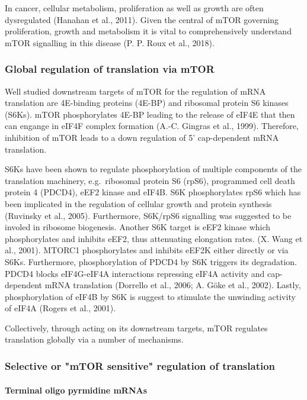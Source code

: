 \documentclass[12pt,openany]{book}
\begin{document}
In cancer, cellular metabolism, proliferation as well as growth are
often dysregulated (Hanahan et al., 2011). Given the central of mTOR
governing proliferation, growth and metabolism it is vital to
comprehensively understand mTOR signalling in this disease (P. P. Roux
et al., 2018).

\subsubsection{Global regulation of translation via mTOR}

Well studied downstream targets of mTOR for the regulation of mRNA
translation are 4E-binding proteins (4E-BP) and ribosomal protein S6
kinases (S6Ks). mTOR phosphorylates 4E-BP leading to the release of
eIF4E that then can engange in eIF4F complex formation (A.-C. Gingras et
al., 1999). Therefore, inhibition of mTOR leads to a down regulation of
5' cap-dependent mRNA translation.

S6Ks have been shown to regulate phosphorylation of multiple components
of the translation machinery, e.g.~ribosomal protein S6 (rpS6),
programmed cell death protein 4 (PDCD4), eEF2 kinase and eIF4B. S6K
phosphorylates rpS6 which has been implicated in the regulation of
cellular growth and protein synthesis (Ruvinsky et al., 2005).
Furthermore, S6K/rpS6 signalling was suggested to be involed in ribosome
biogenesis. Another S6K target is eEF2 kinase which phosphorylates and
inhibits eEF2, thus attenuating elongation rates. (X. Wang et al.,
2001). MTORC1 phosphorylates and inhibits eEF2K either directly or via
S6Ks. Furthermore, phosphorylation of PDCD4 by S6K triggers its
degradation. PDCD4 blocks eIF4G-eIF4A interactions repressing eIF4A
activity and cap-dependent mRNA translation (Dorrello et al., 2006; A.
Göke et al., 2002). Lastly, phosphorylation of eIF4B by S6K is suggest
to stimulate the unwinding activity of eIF4A (Rogers et al., 2001).

Collectively, through acting on its downstream targets, mTOR regulates
translation globally via a number of mechanisms.

\subsubsection{Selective or "mTOR sensitive" regulation of translation}

\paragraph{Terminal oligo pyrmidine mRNAs}
\end{document}
